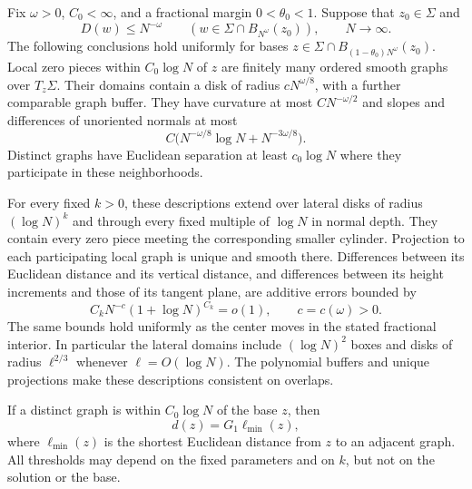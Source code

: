 \begin{lemma}
\label{lem:interface-log-windows}
Fix $\omega>0$, $C_0<\infty$, and a fractional margin $0<\theta_0<1$.
Suppose that $z_0\in\Sigma$ and
\[
 D(w)\le N^{-\omega}\qquad
 (w\in\Sigma\cap B_{N^\omega}(z_0)),\qquad N\longrightarrow\infty.
\]
The following conclusions hold uniformly for bases
$z\in\Sigma\cap B_{(1-\theta_0)N^\omega}(z_0)$.
Local zero pieces within $C_0\log N$ of $z$ are finitely many ordered
smooth graphs over $T_z\Sigma$.  Their domains contain a disk of
radius $cN^{\omega/8}$, with a further comparable graph buffer.
They have curvature at most $CN^{-\omega/2}$ and slopes and differences
of unoriented normals at most
\[
 C\bigl(N^{-\omega/8}\log N+N^{-3\omega/8}\bigr).
\]
Distinct graphs have Euclidean separation at least $c_0\log N$
where they participate in these neighborhoods.

For every fixed $k>0$, these descriptions extend over lateral disks
of radius $(\log N)^k$ and through every fixed multiple of $\log N$
in normal depth.  They contain every zero piece meeting the
corresponding smaller cylinder.  Projection to each participating
local graph is unique and smooth there.  Differences between its
Euclidean distance and its vertical distance, and differences between
its height increments and those of its tangent plane, are additive
errors bounded by
\[
 C_kN^{-c}(1+\log N)^{C_k}=o(1),\qquad c=c(\omega)>0.
\]
The same bounds hold uniformly as the center moves in the stated
fractional interior.  In particular the lateral domains include
$(\log N)^2$ boxes and disks of radius $\ell^{2/3}$ whenever
$\ell=O(\log N)$.  The polynomial buffers and unique projections make
these descriptions consistent on overlaps.

If a distinct graph is within $C_0\log N$ of the base $z$, then
\[
 d(z)=G_1\ell_{\min}(z),
\]
where $\ell_{\min}(z)$ is the shortest Euclidean distance from $z$
to an adjacent graph.  All thresholds may depend on the fixed
parameters and on $k$, but not on the solution or the base.
\end{lemma}

